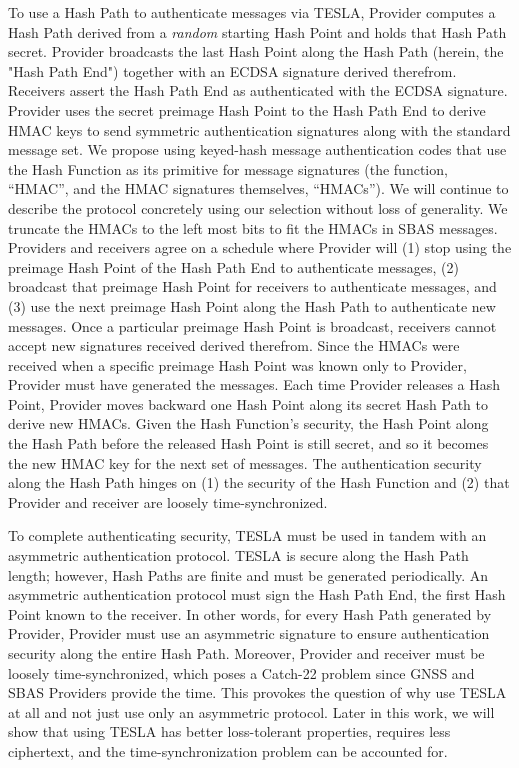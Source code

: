 \documentclass[letterpaper,times]{IONconf/IONconf}
\begin{document}
		To use a Hash Path to authenticate messages via TESLA, Provider computes a Hash Path derived from a {\em random} starting Hash Point and holds that Hash Path secret.
		Provider broadcasts the last Hash Point along the Hash Path (herein, the "Hash Path End") together with an ECDSA signature derived therefrom.
		Receivers assert the Hash Path End as authenticated with the ECDSA signature.
		Provider uses the secret preimage Hash Point to the Hash Path End to derive HMAC keys to send symmetric authentication signatures along with the standard message set.
		We propose using keyed-hash message authentication codes that use the Hash Function as its primitive for message signatures (the function, ``HMAC'', and the HMAC signatures themselves, ``HMACs''). 
		We will continue to describe the protocol concretely using our selection without loss of generality.
		We truncate the HMACs to the left most bits to fit the HMACs in SBAS messages.
		Providers and receivers agree on a schedule where Provider will (1) stop using the preimage Hash Point of the Hash Path End to authenticate messages, (2) broadcast that preimage Hash Point for receivers to authenticate messages, and (3) use the next preimage Hash Point along the Hash Path to authenticate new messages.
		Once a particular preimage Hash Point is broadcast, receivers cannot accept new signatures received derived therefrom.
		Since the HMACs were received when a specific preimage Hash Point was known only to Provider, Provider must have generated the messages.
		Each time Provider releases a Hash Point, Provider moves backward one Hash Point along its secret Hash Path to derive new HMACs.
		Given the Hash Function's security, the Hash Point along the Hash Path before the released Hash Point is still secret, and so it becomes the new HMAC key for the next set of messages.
		The authentication security along the Hash Path hinges on (1) the security of the Hash Function and (2) that Provider and receiver are loosely time-synchronized.

		To complete authenticating security, TESLA must be used in tandem with an asymmetric authentication protocol.
		TESLA is secure along the Hash Path length; however, Hash Paths are finite and must be generated periodically.
		An asymmetric authentication protocol must sign the Hash Path End, the first Hash Point known to the receiver.
		In other words, for every Hash Path generated by Provider, Provider must use an asymmetric signature to ensure authentication security along the entire Hash Path.
		Moreover, Provider and receiver must be loosely time-synchronized, which poses a Catch-22 problem since GNSS and SBAS Providers provide the time.
		This provokes the question of why use TESLA at all and not just use only an asymmetric protocol.
		Later in this work, we will show that using TESLA has better loss-tolerant properties, requires less ciphertext, and the time-synchronization problem can be accounted for.
\end{document}
